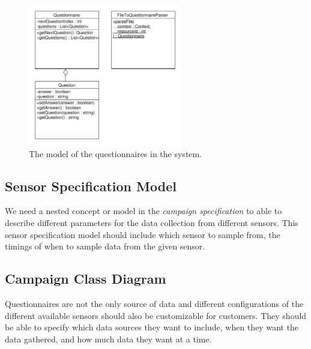 \begin{figure}[!htbp]
	\centering
	\includegraphics[width=0.6\textwidth]{graphic/data_modeling/questionnaire.pdf}
	\caption{The model of the questionnaires in the system.}
	\label{fig:questionnaire_model}
\end{figure}
\FloatBarrier

\subsection{Sensor Specification Model}
\label{sub:sensor_specification_model}

We need a nested concept or model in the \textit{campaign specification} to able to describe different parameters for the data collection from different sensors. This sensor specification model should include which sensor to sample from, the timings of when to sample data from the given sensor. 


\subsection{Campaign Class Diagram}
\label{sub:campagin_class_diagram}

Questionnaires are not the only source of data and different configurations of the different available sensors should also be customizable for customers. They should be able to specify which data sources they want to include, when they want the data gathered, and how much data they want at a time. 


